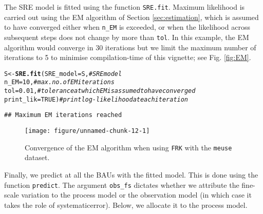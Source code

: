 \documentclass{article}\usepackage[]{graphicx}\usepackage[]{color}
\makeatletter
\def\maxwidth{ %
  \ifdim\Gin@nat@width>\linewidth
    \linewidth
  \else
    \Gin@nat@width
  \fi
}
\newcommand{\hlnum}[1]{\textcolor[rgb]{0.686,0.059,0.569}{#1}}%
\newcommand{\hlcom}[1]{\textcolor[rgb]{0.678,0.584,0.686}{\textit{#1}}}%
\newcommand{\hlstd}[1]{\textcolor[rgb]{0.345,0.345,0.345}{#1}}%
\newcommand{\hlkwb}[1]{\textcolor[rgb]{0.69,0.353,0.396}{#1}}%
\newcommand{\hlkwc}[1]{\textcolor[rgb]{0.333,0.667,0.333}{#1}}%
\newcommand{\hlkwd}[1]{\textcolor[rgb]{0.737,0.353,0.396}{\textbf{#1}}}%
\newenvironment{kframe}{%
 \def\at@end@of@kframe{}%
 \ifinner\ifhmode%
  \def\at@end@of@kframe{\end{minipage}}%
  \begin{minipage}{\columnwidth}%
 \fi\fi%
 \def\FrameCommand##1{\hskip\@totalleftmargin \hskip-\fboxsep
 \colorbox{shadecolor}{##1}\hskip-\fboxsep
     \hskip-\linewidth \hskip-\@totalleftmargin \hskip\columnwidth}%
 \MakeFramed {\advance\hsize-\width
   \@totalleftmargin\z@ \linewidth\hsize
   \@setminipage}}%
 {\par\unskip\endMakeFramed%
 \at@end@of@kframe}
\newenvironment{knitrout}{}{} %
\renewcommand{\tt} {\texttt}
\makeatother
\begin{document}
\vspace{0.1in}

 The SRE model is fitted using the function \tt{SRE.fit}. Maximum likelihood is carried out using the EM algorithm of Section \ref{sec:estimation}, which is assumed to have converged either when \tt{n\_EM} is exceeded, or when the likelihood across subsequent steps does not change by more than \tt{tol}. In this example, the EM algorithm would converge in 30 iterations but we limit the maximum number of iterations to 5 to minimise compilation-time of this vignette; see Fig. \ref{fig:EM}.

\begin{knitrout}
\color{fgcolor}\begin{kframe}
\begin{alltt}
\hlstd{S} \hlkwb{<-} \hlkwd{SRE.fit}\hlstd{(}\hlkwc{SRE_model} \hlstd{= S,}    \hlcom{# SRE model}
             \hlkwc{n_EM} \hlstd{=} \hlnum{10}\hlstd{,}         \hlcom{# max. no. of EM iterations}
             \hlkwc{tol} \hlstd{=} \hlnum{0.01}\hlstd{,}       \hlcom{# tolerance at which EM is assumed to have converged}
             \hlkwc{print_lik}\hlstd{=}\hlnum{TRUE}\hlstd{)}   \hlcom{# print log-likelihood at each iteration}
\end{alltt}
\begin{verbatim}
## Maximum EM iterations reached
\end{verbatim}
\end{kframe}\begin{figure}

{\centering \texttt{[image: figure/unnamed-chunk-12-1]} 

}

\caption{Convergence of the EM algorithm when using \tt{FRK} with the \tt{meuse} dataset.\label{fig:EM}}\label{fig:unnamed-chunk-12}
\end{figure}


\end{knitrout}

\vspace{0.1in}

 Finally, we predict at all the BAUs with the fitted model. This is done using the function \tt{predict}. The argument \tt{obs\_fs} dictates whether we attribute the fine-scale variation to the process model or the observation model (in which case it takes the role of systematicerror). Below, we allocate it to the process model.
\end{document}
